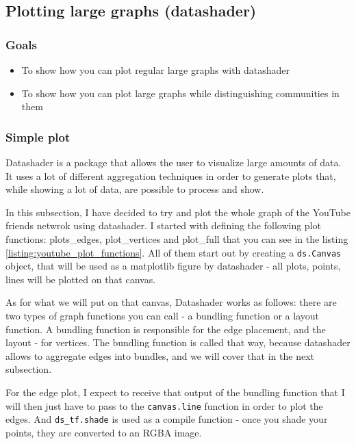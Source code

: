 \documentclass[12pt, a4paper]{article}
\begin{document}
\newpage
\subsection{Plotting large graphs (datashader)}
\subsubsection{Goals}

\begin{itemize}
  \item To show how you can plot regular large graphs with datashader
  \item To show how you can plot large graphs while distinguishing communities in them
\end{itemize}

\subsubsection{Simple plot}


Datashader is a package that allows the user to visualize large amounts of data. It uses a lot of different aggregation techniques in order to generate plots that, while showing a lot of data, are possible to process and show.


In this subsection, I have decided to try and plot the whole graph of the YouTube friends netwrok using datashader. I started with defining the following plot functions: plots\_edges, plot\_vertices and plot\_full that you can see in the listing \ref{listing:youtube_plot_functions}. All of them start out by creating a \texttt{ds.Canvas} object, that will be used as a matplotlib figure by datashader - all plots, points, lines will be plotted on that canvas.

As for what we will put on that canvas, Datashader works as follows: there are two types of graph functions you can call - a bundling function or a layout function. A bundling function is responsible for the edge placement, and the layout - for vertices. The bundling function is called that way, because datashader allows to aggregate edges into bundles, and we will cover that in the next subsection.

For the edge plot, I expect to receive that output of the bundling function that I will then just have to pass to the \texttt{canvas.line} function in order to plot the edges. And \texttt{ds\_tf.shade} is used as a compile function - once you shade your points, they are converted to an RGBA image.
\end{document}
